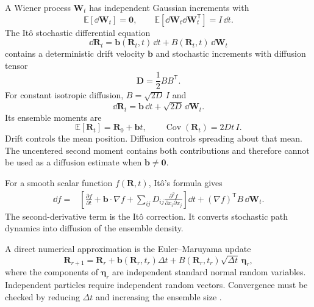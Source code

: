 A Wiener process $\bm W_t$ has independent Gaussian increments with
\begin{equation}
  \mathbb E[\dd\bm W_t]=\bm 0,
  \qquad
  \mathbb E[\dd\bm W_t\dd\bm W_t^{\mathsf T}]
  =I\,\dd t.
  \label{eq:transport-wiener-increments}
\end{equation}
The It\^o stochastic differential equation
\begin{equation}
  \dd\bm R_t
  =\bm b(\bm R_t,t)\,\dd t
  +B(\bm R_t,t)\,\dd\bm W_t
  \label{eq:transport-general-sde}
\end{equation}
contains a deterministic drift velocity $\bm b$ and stochastic increments with
diffusion tensor
\begin{equation}
  \bm D=\frac12BB^{\mathsf T}.
  \label{eq:transport-diffusion-tensor}
\end{equation}
For constant isotropic diffusion, $B=\sqrt{2D}\,I$ and
\begin{equation}
  \dd\bm R_t=\bm b\,\dd t+\sqrt{2D}\,\dd\bm W_t.
  \label{eq:transport-isotropic-sde}
\end{equation}
Its ensemble moments are
\begin{equation}
  \mathbb E[\bm R_t]=\bm R_0+\bm b t,
  \qquad
  \operatorname{Cov}(\bm R_t)=2Dt\,I.
  \label{eq:transport-sde-moments}
\end{equation}
Drift controls the mean position.  Diffusion controls spreading about that
mean.  The uncentered second moment contains both contributions and therefore
cannot be used as a diffusion estimate when $\bm b\ne\bm0$.

For a smooth scalar function $f(\bm R,t)$, It\^o's formula gives
\begin{equation}
\begin{aligned}
  \dd f={}&
  \left[
    \frac{\partial f}{\partial t}
    +\bm b\cdot\nabla f
    +\sum_{ij}D_{ij}\frac{\partial^2f}{\partial x_i\partial x_j}
  \right]\dd t
  +(\nabla f)^{\mathsf T}B\,\dd\bm W_t.
\end{aligned}
  \label{eq:transport-ito-formula}
\end{equation}
The second-derivative term is the It\^o correction.  It converts stochastic
path dynamics into diffusion of the ensemble density.

A direct numerical approximation is the Euler--Maruyama update
\begin{equation}
  \bm R_{r+1}
  =\bm R_r+\bm b(\bm R_r,t_r)\Delta t
  +B(\bm R_r,t_r)\sqrt{\Delta t}\,\bm\eta_r,
  \label{eq:transport-euler-maruyama}
\end{equation}
where the components of $\bm\eta_r$ are independent standard normal random
variables.  Independent particles require independent random vectors.
Convergence must be checked by reducing $\Delta t$ and increasing the ensemble
size \cite{higham2001,kloedenPlaten1992}.

